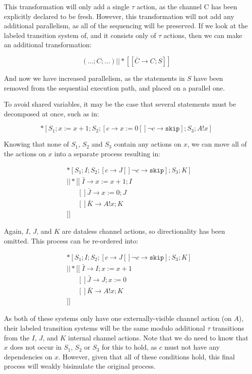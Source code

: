 \documentclass[times, 10pt]{article}
\begin{document}
This transformation will only add a single $\tau$ action, as the channel C has
been explicitly declared to be fresh.  However, this transformation will not add
any additional parallelism, as all of the sequencing will be preserved. If we
look at the labeled transition system of, and it consists only of $\tau$
actions, then we can make an additional transformation:

\[
(...;C;...) || *[[\bar{C} \rightarrow C; S]]
\]

And now we have increased parallelism, as the statements in $S$ have been
removed from the sequential execution path, and placed on a parallel one.

To avoid shared variables, it may be the case that several statements must be
decomposed at once, such as in:

\[
*[S_1; x := x + 1; S_2; [ c \rightarrow x := 0 [] \lnot c \rightarrow \texttt{skip} ]; S_3; A!x ] 
\]

Knowing that none of $S_1$, $S_2$ and $S_3$ contain any actions on $x$, we can
move all of the actions on $x$ into a separate process resulting in:

\begin{align*}
& *[S_1; I; S_2; [ c \rightarrow J [] \lnot c \rightarrow \texttt{skip} ]; S_3; K] \\
& || *[[\;\bar{I} \rightarrow x := x + 1; I \\
&\;\;\;\;\;\;[] \bar{J} \rightarrow x := 0; J \\
&\;\;\;\;\;\;[] \bar{K} \rightarrow  A!x; K \\
&]]
\end{align*}

Again, $I$, $J$, and $K$ are dataless channel actions, so directionality has
been omitted. This process can be re-ordered into:

\begin{align*}
& *[S_1; I; S_2; [ c \rightarrow J [] \lnot c \rightarrow \texttt{skip} ]; S_3; K] \\
& || *[[\;\bar{I} \rightarrow I; x := x + 1 \\
&\;\;\;\;\;\;[] \bar{J} \rightarrow J; x := 0 \\
&\;\;\;\;\;\;[] \bar{K} \rightarrow  A!x; K \\
&]]
\end{align*}

As both of these systems only have one externally-visible channel action (on
$A$), their labeled transition systems will be the same modulo additional $\tau$
transitions from the $I$, $J$, and $K$ internal channel actions. Note that we do
need to know that $x$ does not occur in $S_1$, $S_2$ or $S_3$ for this to hold,
as $c$ must not have any dependencies on $x$. However, given that all of these
conditions hold, this final process will weakly bisimulate the original process.
\end{document}
